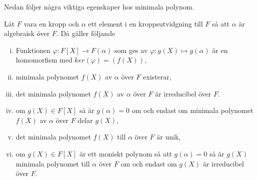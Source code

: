 \documentclass{article}
\theoremstyle{definition}
\begin{document}
Nedan följer några viktiga egenskaper hos minimala polynom.
\hypertarget{minpol}{}
\begin{mytheo}{}{}
  Låt $F$ vara en kropp och $\alpha$ ett element i en kroppsutvidgning till $F$ så att $\alpha$ är algebraisk över $F$. Då gäller följande 
  \begin{enumerate}[(i)]
    \item Funktionen $\varphi: F[X] \rightarrow F(\alpha)$ som ges av $\varphi: g(X) \mapsto g(\alpha)$ är en homomorfism med $ker(\varphi) = (f(X)),$
    \item minimala polynomet $f(X)$ av $\alpha$ över $F$ existerar,
    \item det minimala polynomet $f(X)$ av $\alpha$ över $F$ är irreducibel över $F$.
    \item om $g(X) \in F[X]$ så är $g(\alpha) = 0$ om och endast om minimala polynomet $f(X)$ av $\alpha$ över $F$ delar $g(X),$
    \item det minimala polynomet $f(X)$ till $\alpha$ över $F$ är unik, 
    \item om $g(X) \in F[X]$ är ett moniskt polynom så att $g(\alpha) = 0$ så är $g(X)$ minimala polynomet till $\alpha$ över $F$ om och endast 
    om $g(X)$ är irreducibel över $F$.
  \end{enumerate}
\end{mytheo}
\end{document}
